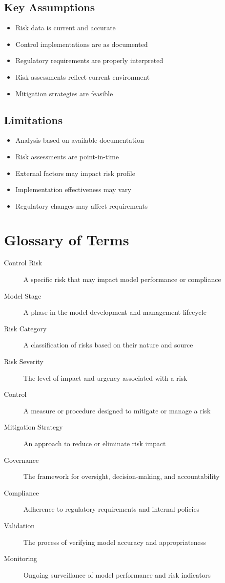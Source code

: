 \documentclass[11pt,a4paper]{article}
\begin{document}
\subsection{Key Assumptions}
\begin{itemize}
\item Risk data is current and accurate
\item Control implementations are as documented
\item Regulatory requirements are properly interpreted
\item Risk assessments reflect current environment
\item Mitigation strategies are feasible
\end{itemize}

\subsection{Limitations}
\begin{itemize}
\item Analysis based on available documentation
\item Risk assessments are point-in-time
\item External factors may impact risk profile
\item Implementation effectiveness may vary
\item Regulatory changes may affect requirements
\end{itemize}

\section{Glossary of Terms}

\begin{description}
\item[Control Risk] A specific risk that may impact model performance or compliance
\item[Model Stage] A phase in the model development and management lifecycle
\item[Risk Category] A classification of risks based on their nature and source
\item[Risk Severity] The level of impact and urgency associated with a risk
\item[Control] A measure or procedure designed to mitigate or manage a risk
\item[Mitigation Strategy] An approach to reduce or eliminate risk impact
\item[Governance] The framework for oversight, decision-making, and accountability
\item[Compliance] Adherence to regulatory requirements and internal policies
\item[Validation] The process of verifying model accuracy and appropriateness
\item[Monitoring] Ongoing surveillance of model performance and risk indicators
\end{description}
\end{document}
